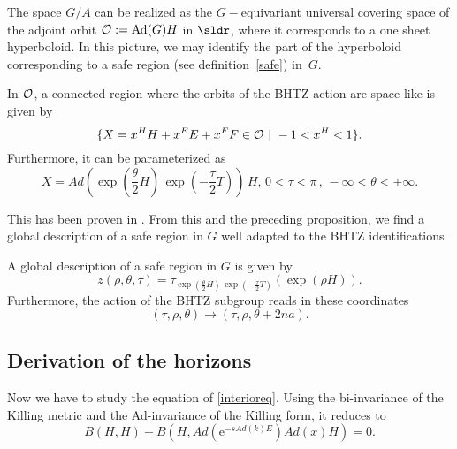 The space $G/A$ can be realized as the $G-$equivariant universal covering space of the adjoint orbit ${\cal O}:= \mbox{Ad}(G)H$ in $\sldr$, where it corresponds to a one sheet hyperboloid. In this picture, we may identify the part of the hyperboloid corresponding to a safe region (see definition~\ref{safe}) in~$G$.

\begin{lemma}
In ${\cal O}$, a connected region where the orbits of the BHTZ action are space-like is given by
\begin{equation}
 \{ X = x^H H+x^E E + x^F F \in {\cal O} \,\, | \,\, -1 < x^H <
 1\}.
\end{equation}
Furthermore, it can be parameterized as
\begin{equation}
 X = Ad\left(\exp(\frac{\theta}{2}H) \, \exp(-\frac{\tau}{2}
 T)\right)\, H, \, 0<\tau<\pi \, ,\,  -\infty<\theta<+\infty
 .
\end{equation}
\end{lemma}
This has been proven in \cite{BTZB_un}. From this and the preceding proposition, we find a global description of a safe region in $G$ well adapted to the BHTZ identifications.

\begin{proposition}
A global description of a safe region in $G$ is given by
\begin{equation}\label{CoordGlob}
 z(\rho,\theta,\tau) =
\tau_{\exp(\frac{\theta}{2}H) \,
 \exp(-\frac{\tau}{2}
 T)}(\exp(\rho H)).
 \end{equation}
 Furthermore, the action of the BHTZ subgroup reads in these coordinates
\begin{equation}
 (\tau , \rho, \theta) \rightarrow (\tau, \rho, \theta + 2 n
a).
\end{equation}
\end{proposition}


\subsection{Derivation of the horizons}

Now we have to study the equation of \eqref{interioreq}. Using the bi-invariance of the Killing metric and the Ad-invariance of the Killing form, it reduces to
\begin{equation}\label{EqHoriz}
B(H,H) - B(H,Ad(\mbox{e}^{-s Ad(k)E}) Ad(x) H) = 0.
\end{equation}

